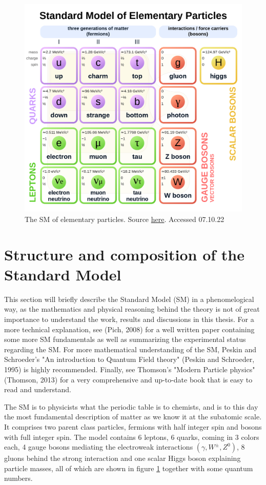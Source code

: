 
\begin{figure}[h!]
    \includegraphics[width=0.7\linewidth]{Figures/SM/Standard_Model_of_Elementary_Particles.svg.png}
    \caption[The Standard Model]{The SM of elementary particles. Source \href{https://upload.wikimedia.org/wikipedia/commons/thumb/0/00/Standard_Model_of_Elementary_Particles.svg/1200px-Standard_Model_of_Elementary_Particles.svg.png}{here}. Accessed 07.10.22}
    \label{fig:smdiagram}
\end{figure}

\section{Structure and composition of the Standard Model}
This section will briefly describe the Standard Model (SM) in a phenomelogical way, as the mathematics and 
physical reasoning behind the theory is not of great 
importance to understand the work, results and discussions in this thesis. For a more 
technical explanation, see (Pich, 2008)\cite{Pich:819632} for a 
well written paper containing some more SM fundamentals as well as summarizing the 
experimental status regarding the SM.
For more mathematical understanding of the SM, Peskin and Schroeder's "An introduction 
to Quantum Field theory" (Peskin and Schroeder, 1995)\cite{Peskin:1995ev}
 is highly recommended. Finally, see Thomson's "Modern Particle physics" (Thomson, 2013)
 \cite{Thomson:2013zua} for a very comprehensive and up-to-date book that is easy to read and 
 understand. \par
The SM is to physicists what the periodic table is to chemists, and is to this day the most fundamental description of 
matter as we know it at the subatomic scale. It comprises two parent class particles, fermions with half integer 
spin and bosons with full integer spin. The model contains 
6 leptons, 6 quarks, coming in 3 colors each, 4 gauge bosons mediating the electroweak interactions $(\gamma, W^{\pm}, Z^{0})$, 
8 gluons behind the strong interaction and one 
scalar Higgs boson explaining particle masses, all of which are shown in figure \ref{fig:smdiagram} together with some quantum numbers.



